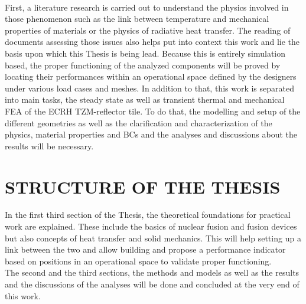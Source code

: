 \\
\break
\normalsize{\indent First, a literature research is carried out to understand the physics involved in those phenomenon such as the link between temperature and mechanical properties of materials or the physics of radiative heat transfer. The reading of documents assessing those issues also helps put into context this work and lie the basis upon which this Thesis is being lead. Because this is entirely simulation based, the proper functioning of the analyzed components will be proved by locating their performances within an operational space defined by the designers under various load cases and meshes. In addition to that, this work is separated into main tasks, the steady state as well as transient thermal and mechanical FEA of the \acrshort{ECRH} TZM-reflector tile. To do that, the modelling and setup of the different geometries as well as the clarification and characterization of the physics, material properties and \acrshort{BCs} and the analyses and discussions about the results will be necessary.}

\section{STRUCTURE OF THE THESIS}
\normalsize{In the first third section of the Thesis, the theoretical foundations for practical work are explained. These include the basics of nuclear fusion and fusion devices but also concepts of heat transfer and solid mechanics. This will help setting up a link between the two and allow building and propose a performance indicator based on positions in an operational space to validate proper functioning.}
\\
\break
\normalsize{\indent The second and the third sections, the methods and models as well as the results and the discussions of the analyses will be done and concluded at the very end of this work.}
